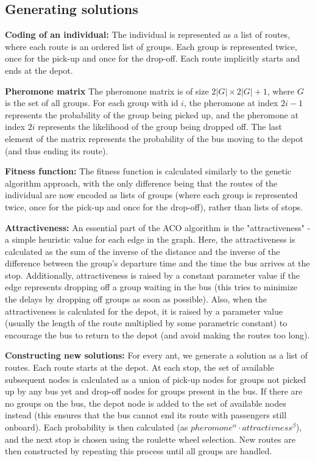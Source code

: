 \subsection{Generating solutions}


\textbf{Coding of an individual:}
The individual is represented as a list of routes, where each route is an ordered list of groups. Each group is represented twice, once for the pick-up and once for the drop-off. Each route implicitly starts and ends at the depot.

\textbf{Pheromone matrix}
The pheromone matrix is of size $2|G| \times 2|G| + 1$, where $G$ is the set of all groups. For each group with id $i$, the pheromone at index $2i - 1$ represents the probability of the group being picked up, and the pheromone at index $2i$ represents the likelihood of the group being dropped off. The last element of the matrix represents the probability of the bus moving to the depot (and thus ending its route).

\textbf{Fitness function:}
The fitness function is calculated similarly to the genetic algorithm approach, with the only difference being that the routes of the individual are now encoded as lists of groups (where each group is represented twice, once for the pick-up and once for the drop-off), rather than lists of stops.

\textbf{Attractiveness:}
An essential part of the ACO algorithm is the "attractiveness" - a simple heuristic value for each edge in the graph. Here, the attractiveness is calculated as the sum of the inverse of the distance and the inverse of the difference between the group's departure time and the time the bus arrives at the stop. Additionally, attractiveness is raised by a constant parameter value if the edge represents dropping off a group waiting in the bus (this tries to minimize the delays by dropping off groups as soon as possible). Also, when the attractiveness is calculated for the depot, it is raised by a parameter value (usually the length of the route multiplied by some parametric constant) to encourage the bus to return to the depot (and avoid making the routes too long).

\textbf{Constructing new solutions:}
For every ant, we generate a solution as a list of routes. Each route starts at the depot. At each stop, the set of available subsequent nodes is calculated as a union of pick-up nodes for groups not picked up by any bus yet and drop-off nodes for groups present in the bus. If there are no groups on the bus, the depot node is added to the set of available nodes instead (this ensures that the bus cannot end its route with passengers still onboard). Each probability is then calculated (as $pheromone^\alpha \cdot attractivness^\beta$), and the next stop is chosen using the roulette wheel selection. New routes are then constructed by repeating this process until all groups are handled.
